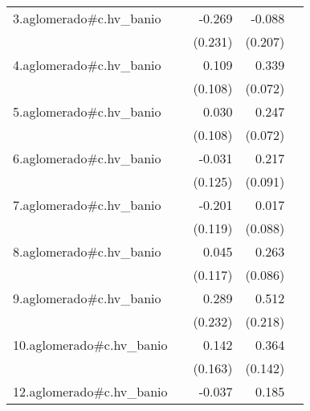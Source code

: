 {\begin{longtable}{l*{4}{D{.}{.}{-1}}}
\addlinespace
3.aglomerado#c.hv\_banio&                     &      -0.269         &      -0.088         &                     \\
            &                     &     (0.231)         &     (0.207)         &                     \\
\addlinespace
4.aglomerado#c.hv\_banio&                     &       0.109         &       0.339\sym{***}&                     \\
            &                     &     (0.108)         &     (0.072)         &                     \\
\addlinespace
5.aglomerado#c.hv\_banio&                     &       0.030         &       0.247\sym{***}&                     \\
            &                     &     (0.108)         &     (0.072)         &                     \\
\addlinespace
6.aglomerado#c.hv\_banio&                     &      -0.031         &       0.217\sym{*}  &                     \\
            &                     &     (0.125)         &     (0.091)         &                     \\
\addlinespace
7.aglomerado#c.hv\_banio&                     &      -0.201         &       0.017         &                     \\
            &                     &     (0.119)         &     (0.088)         &                     \\
\addlinespace
8.aglomerado#c.hv\_banio&                     &       0.045         &       0.263\sym{**} &                     \\
            &                     &     (0.117)         &     (0.086)         &                     \\
\addlinespace
9.aglomerado#c.hv\_banio&                     &       0.289         &       0.512\sym{*}  &                     \\
            &                     &     (0.232)         &     (0.218)         &                     \\
\addlinespace
10.aglomerado#c.hv\_banio&                     &       0.142         &       0.364\sym{*}  &                     \\
            &                     &     (0.163)         &     (0.142)         &                     \\
\addlinespace
12.aglomerado#c.hv\_banio&                     &      -0.037         &       0.185         &                     \\

\end{longtable}}
